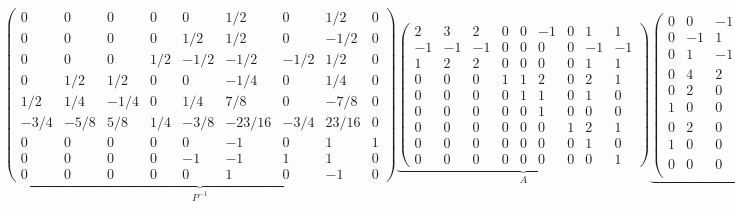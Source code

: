 \documentclass{article}
\begin{document}
\begin{equation*}
\underbrace{
\left(\begin{array}{ccccccccc}
       0&	   0&	   0&	  0&	   0&	   1/2&	   0&	  1/2&	0\\
       0&	   0&	   0&	  0&	 1/2&	   1/2&	   0&	 -1/2&	0\\
       0&	   0&	   0&	1/2&	-1/2&	  -1/2&	-1/2&	  1/2&	0\\
       0&	 1/2&	 1/2&	  0&	   0&	  -1/4&	   0&	  1/4&	0\\
     1/2&	 1/4&	-1/4&	  0&	 1/4&	   7/8&	   0&	 -7/8&	0\\
    -3/4&	-5/8&	 5/8&	1/4&	-3/8&	-23/16&	-3/4&	23/16&	0\\
       0&	   0&	   0&	  0&	   0&	    -1&	   0&	    1&	1\\
       0&	   0&	   0&	  0&	  -1&	    -1&	   1&	    1&	0\\
       0&	   0&	   0&	  0&	   0&	     1&	   0&	   -1&	0
\end{array}\right)}_{P^{-1}}
\underbrace{
\left(\begin{array}{ccccccccc}
     2 & 3 & 2 & 0 & 0 &-1 & 0 & 1 & 1\\
    -1 &-1 &-1 & 0 & 0 & 0 & 0 &-1 &-1\\
     1 & 2 & 2 & 0 & 0 & 0 & 0 & 1 & 1\\
     0 & 0 & 0 & 1 & 1 & 2 & 0 & 2 & 1\\
     0 & 0 & 0 & 0 & 1 & 1 & 0 & 1 & 0\\
     0 & 0 & 0 & 0 & 0 & 1 & 0 & 0 & 0\\
     0 & 0 & 0 & 0 & 0 & 0 & 1 & 2 & 1\\
     0 & 0 & 0 & 0 & 0 & 0 & 0 & 1 & 0\\
     0 & 0 & 0 & 0 & 0 & 0 & 0 & 0 & 1
\end{array}\right)}_{A}
\underbrace{
\left(\begin{array}{ccccccccc}
    0&	 0&	-1&	0&	 5&	 2&	0&	 1&	  -1\\
    0&	-1&	 1&	1&	-3&	-2&	0&	-1&	   0\\
    0&	 1&	-1&	1&	 3&	 2&	0&	 1&	 1/2\\
    0&	 4&	 2&	0&	 0&	 0&	0&	 1&	   0\\
    0&	 2&	 0&	0&	 0&	 0&	0&	 0&	  -1\\
    1&	 0&	 0&	0&	 0&	 0&	0&	 0&	 1/2\\
    0&	 2&	 0&	0&	 0&	 0&	0&	 1&	   0\\
    1&	 0&	 0&	0&	 0&	 0&	0&	 0&	-1/2\\
    0&	 0&	 0&	0&	 0&	 0&	1&	 0&	   1\\
\end{array}\right)}_{P}
\end{equation*}
\end{document}
